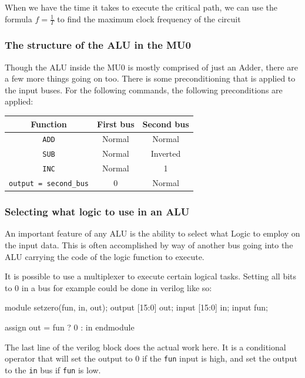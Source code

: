 When we have the time it takes to execute the critical path, we can use the
formula $f = \frac{1}{T}$ to find the maximum clock frequency of the circuit

\subsubsection{The structure of the ALU in the MU0}

Though the ALU inside the MU0 is mostly comprised of just an Adder, there are a
few more things going on too. There is some preconditioning that is applied to
the input buses. For the following commands, the following preconditions are
applied:

\begin{center}
	\begin{tabular}{|c|c|c|}
		\hline
		{\bf Function} & {\bf First bus} & {\bf Second bus}\\ \hline
		{\tt ADD} & Normal & Normal\\ \hline
		{\tt SUB} & Normal & Inverted\\ \hline
		{\tt INC} & Normal & 1\\ \hline
		{\tt output = second\_bus} & 0 & Normal\\ \hline
	\end{tabular}
\end{center}



\subsubsection*{Selecting what logic to use in an ALU}

An important feature of any ALU is the ability to select what Logic to employ on
the input data. This is often accomplished by way of another bus going into the
ALU carrying the code of the logic function to execute.

It is possible to use a multiplexer to execute certain logical tasks. Setting
all bits to 0 in a bus for example could be done in verilog like so:

\begin{listing}{1}
module setzero(fun, in, out);
	output [15:0] out;
	input [15:0] in;
	input fun;

	assign out = fun ? 0 : in
endmodule
\end{listing}

The last line of the verilog block does the actual work here. It is a
conditional operator that will set the output to 0 if the {\tt fun} input is
high, and set the output to the {\tt in} bus if {\tt fun} is low.

